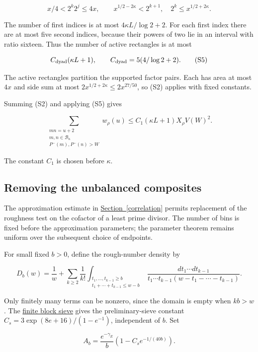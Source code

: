 \[
x/4<2^k2^j\le4x,
\qquad
x^{1/2-2\kappa}<2^{k+1},\quad 2^k\le x^{1/2+2\kappa}.
\]

The number of first indices is at most \(4\kappa L/\log2+2\). For each
first index there are at most five second indices, because their powers
of two lie in an interval with ratio sixteen. Thus the number of active
rectangles is at most

\[
C_{\rm dyad}(\kappa L+1),\qquad
C_{\rm dyad}=5(4/\log2+2). \tag{S5}
\]

The active rectangles partition the supported factor pairs. Each has
area at most \(4x\) and side sum at most
\(2x^{1/2+2\kappa}\le2x^{27/50}\), so (S2) applies with fixed constants.

Summing (S2) and applying (S5) gives

\[
\sum_{\substack{mn=u+2\\m,n\in\mathcal B_\kappa\\
P^-(m),P^-(n)>W}}w_\rho(u)
\le C_1(\kappa L+1)X_\rho V(W)^2. \tag{S6}
\]

The constant \(C_1\) is chosen before \(\kappa\).


\hypertarget{sieve-removing-the-unbalanced-composites}{%
\subsection{Removing the unbalanced
composites}\label{sieve-removing-the-unbalanced-composites}}

The approximation estimate in
\protect\hyperlink{correlation}{Section~\ref{correlation}} permits
replacement of the roughness test on the cofactor of a least prime
divisor. The number of bins is fixed before the approximation
parameters; the parameter theorem remains uniform over the subsequent
choice of endpoints.

For small fixed \(b>0\), define the rough-number density by

\[
D_b(w)=\frac1w+
\sum_{k\ge2}\frac1{k!}
\int_{\substack{t_1,\ldots,t_{k-1}\ge b\\
                 t_1+\cdots+t_{k-1}\le w-b}}
\frac{dt_1\cdots dt_{k-1}}
 {t_1\cdots t_{k-1}(w-t_1-\cdots-t_{k-1})}.
\]

Only finitely many terms can be nonzero, since the domain is empty when
\(kb>w\). The \protect\hyperlink{block-sieve}{finite block sieve} gives
the preliminary-sieve constant \(C_s=3\exp(8e+16)/(1-e^{-1})\),
independent of \(b\). Set

\[
A_b=\frac{e^{-\gamma_E}}b
       \left(1-C_s e^{-1/(40b)}\right).
\]

